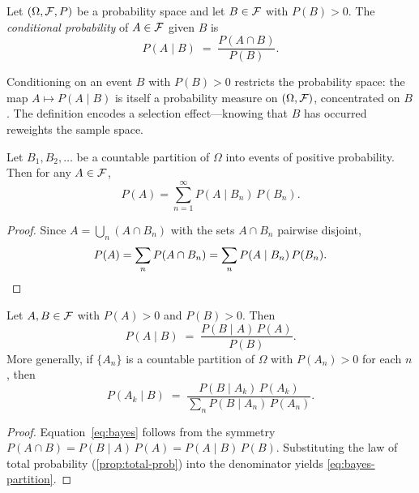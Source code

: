 \begin{definition}\label{def:cond-prob}
Let $(\Omega, \mathcal{F}, P)$ be a probability space and let $B \in \mathcal{F}$ with $P(B) > 0$. The \emph{conditional probability} of $A \in \mathcal{F}$ given $B$ is
\[
P(A \mid B) \;=\; \frac{P(A \cap B)}{P(B)}.
\]
\end{definition}

\begin{remark}
Conditioning on an event $B$ with $P(B) > 0$ restricts the probability space: the map $A \mapsto P(A \mid B)$ is itself a probability measure on $(\Omega, \mathcal{F})$, concentrated on $B$. The definition encodes a selection effect---knowing that $B$ has occurred reweights the sample space.
\end{remark}

\begin{proposition}\label{prop:total-prob}
Let $B_1, B_2, \ldots$ be a countable partition of $\Omega$ into events of positive probability. Then for any $A \in \mathcal{F}$,
\[
P(A) = \sum_{n=1}^\infty P(A \mid B_n)\, P(B_n).
\]
\end{proposition}

\begin{proof}
Since $A = \bigcup_n (A \cap B_n)$ with the sets $A \cap B_n$ pairwise disjoint,
\[
P(A) = \sum_n P(A \cap B_n) = \sum_n P(A \mid B_n)\, P(B_n). \qedhere
\]
\end{proof}

\begin{theorem}\label{thm:bayes}
Let $A, B \in \mathcal{F}$ with $P(A) > 0$ and $P(B) > 0$. Then
\begin{equation}\label{eq:bayes}
P(A \mid B) \;=\; \frac{P(B \mid A)\, P(A)}{P(B)}.
\end{equation}
More generally, if $\{A_n\}$ is a countable partition of $\Omega$ with $P(A_n) > 0$ for each $n$, then
\begin{equation}\label{eq:bayes-partition}
P(A_k \mid B) \;=\; \frac{P(B \mid A_k)\, P(A_k)}{\displaystyle\sum_n P(B \mid A_n)\, P(A_n)}.
\end{equation}
\end{theorem}

\begin{proof}
Equation~\eqref{eq:bayes} follows from the symmetry $P(A \cap B) = P(B \mid A)\, P(A) = P(A \mid B)\, P(B)$. Substituting the law of total probability (\cref{prop:total-prob}) into the denominator yields \eqref{eq:bayes-partition}.
\end{proof}

